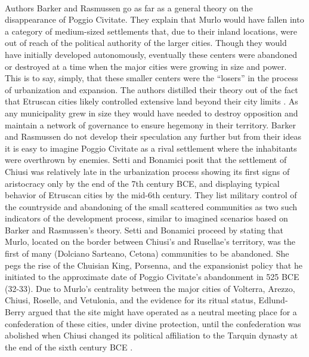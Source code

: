 \documentclass[12pt,a4paper]{thesis}
\begin{document}
\paragraph{}
Authors Barker and Rasmussen go as far as a general theory on the disappearance of Poggio Civitate. They explain that Murlo would have fallen into a category of medium-sized settlements that, due to their inland locations, were out of reach of the political authority of the larger cities. Though they would have initially developed autonomously, eventually these centers were abandoned or destroyed at a time when the major cities were growing in size and power. This is to say, simply, that these smaller centers were the ``losers'' in the process of urbanization and expansion. The authors distilled their theory out of the fact that Etruscan cities likely controlled extensive land beyond their city limits \cite[p. 100,176]{BarRas98}. As any municipality grew in size they would have needed to destroy opposition and maintain a network of governance to ensure hegemony in their territory. Barker and Rasmussen do not develop their speculation any further but from their ideas it is easy to imagine Poggio Civitate as a rival settlement where the inhabitants were overthrown by enemies. Setti and Bonamici \citeyearpar{SetBon85} posit that the settlement of Chiusi was relatively late in the urbanization process showing its first signs of aristocracy only by the end of the 7th century BCE, and displaying typical behavior of Etruscan cities by the mid-6th century. They list military control of the countryside and abandoning of the small scattered communities as two such indicators of the development process, similar to imagined scenarios based on Barker and Rasmussen's theory. Setti and Bonamici proceed by stating that Murlo, located on the border between Chiusi's and Rusellae's territory, was the first of many (Dolciano Sarteano, Cetona) communities to be abandoned. She pegs the rise of the Chuisian King, Porsenna, and the expansionist policy that he initiated to the approximate date of Poggio Civitate's abandonment in 525 BCE (32-33). Due to Murlo's centrality between the major cities of Volterra, Arezzo, Chiusi, Roselle, and Vetulonia, and the evidence for its ritual status, Edlund-Berry \citeyearpar{IEB94} argued that the site might have operated as a neutral meeting place for a confederation of these cities, under divine protection, until the confederation was abolished when Chiusi changed its political affiliation to the Tarquin dynasty at the end of the sixth century BCE \cite[p. 176-177]{BarRas98}.
\end{document}

